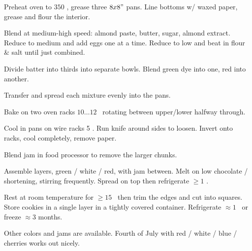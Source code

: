 \begin{preparation}
\item Preheat oven to $350$ \Fahrenheit, grease three $8x8"$ pans.
Line bottoms w/ waxed paper, grease and flour the interior.

\item Blend at medium-high speed: almond paste, butter, sugar, almond extract.
Reduce to medium and add eggs one at a time.
Reduce to low and beat in flour \& salt until just combined.

\item Divide batter into thirds into separate bowls.
Blend green dye into one, red into another.

\item Transfer and spread each mixture evenly into the pans.

\item Bake on two oven racks $10 \dots 12$ \minute~rotating between upper/lower halfway through.

\item Cool in pans on wire racks 5 \minute.
	Run knife around sides to loosen.
	Invert onto racks, cool completely, remove paper.

\item Blend jam in food processor to remove the larger chunks.

\item Assemble layers, green / white / red, with jam between.
	Melt on low chocolate / shortening, stirring frequently.
	Spread on top then refrigerate $\geq1$ \hour.

\item Rest at room temperature for $\geq 15$ \minute~then trim the edges and cut into squares.
	Store cookies in a single layer in a tightly covered container.
	Refrigerate $\approx 1$ \week~or freeze $\approx 3$ months.
\end{preparation}


\begin{variation}
\item Other colors and jams are available.
	Fourth of July with red / white / blue / cherries works out nicely.
\end{variation}
\recipeend
